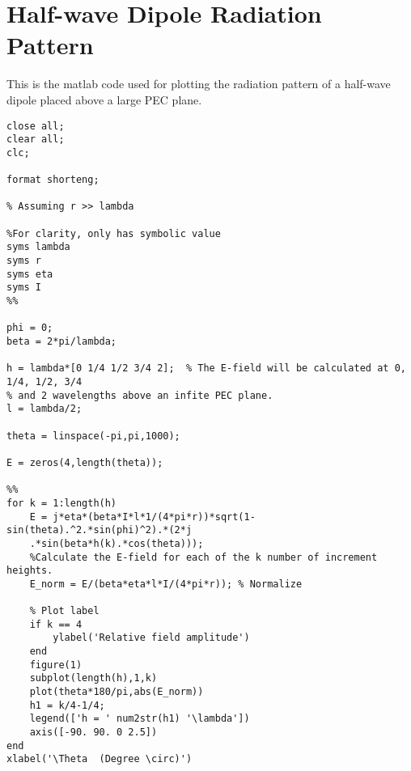\chapter{Half-wave Dipole Radiation Pattern}\label{app:rasmusmatlab}

This is the matlab code used for plotting the radiation pattern of a half-wave dipole placed above a large PEC plane.



\begin{lstlisting}
close all;
clear all;
clc;

format shorteng;

% Assuming r >> lambda

%For clarity, only has symbolic value
syms lambda
syms r
syms eta
syms I 
%%

phi = 0;
beta = 2*pi/lambda;

h = lambda*[0 1/4 1/2 3/4 2];  % The E-field will be calculated at 0, 1/4, 1/2, 3/4
% and 2 wavelengths above an infite PEC plane.
l = lambda/2;

theta = linspace(-pi,pi,1000);

E = zeros(4,length(theta));

%%
for k = 1:length(h)
    E = j*eta*(beta*I*l*1/(4*pi*r))*sqrt(1-sin(theta).^2.*sin(phi)^2).*(2*j
    .*sin(beta*h(k).*cos(theta))); 
    %Calculate the E-field for each of the k number of increment heights.
    E_norm = E/(beta*eta*l*I/(4*pi*r)); % Normalize
    
    % Plot label
    if k == 4
        ylabel('Relative field amplitude')
    end
    figure(1)
    subplot(length(h),1,k)
    plot(theta*180/pi,abs(E_norm))
    h1 = k/4-1/4;
    legend(['h = ' num2str(h1) '\lambda'])
    axis([-90. 90. 0 2.5])
end
xlabel('\Theta  (Degree \circ)')

\end{lstlisting}